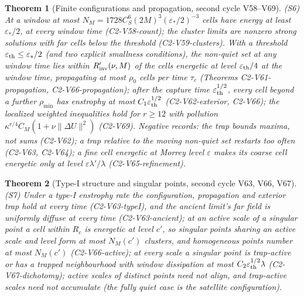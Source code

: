 \documentclass[11pt]{article}
\theoremstyle{plain}
\newtheorem{theorem}{Theorem}[section]
\theoremstyle{definition}
\theoremstyle{remark}
\begin{document}
\begin{theorem}[Finite configurations and propagation, second cycle V58--V69]
\label{thm:c4v1-propagation}
(S6) At a window at most \(N_M=1728C_S^6(2M)^3(\varepsilon_*/2)^{-3}\) cells have
energy at least \(\varepsilon_*/2\), at every window time (C2-V58-count); the
cluster limits are nonzero strong solutions with far cells below the
threshold (C2-V59-clusters).  With a threshold \(\varepsilon_{\rm th}\le\varepsilon_*/2\)
(and two explicit smallness conditions), the non-quiet set at any
window time lies within \(R'_{\rm inv}(\nu,M)\) of the cells energetic at
level \(\varepsilon_{\rm th}/4\) at the window time, propagating at most \(\rho_0\)
cells per time \(\tau_c\) (Theorems C2-V61-propagation,
C2-V66-propagation); after the capture time \(\varepsilon_{\rm th}^{1/2}\), every
cell beyond a further \(\rho_{\min}\) has enstrophy at most
\(C_1\varepsilon_{\rm th}^{1/2}\) (C2-V62-exterior, C2-V66); the localized weighted
inequalities hold for \(r\ge12\) with pollution \(\kappa^{r/4}C_M(1+\nu\|\Delta U\|^2)\)
(C2-V69).  Negative records: the trap bounds maxima, not sums
(C2-V62); a trap relative to the moving non-quiet set restarts too
often (C2-V63, C2-V64); a fine cell energetic at Morrey level \(\varepsilon\)
makes its coarse cell energetic only at level \(\varepsilon\lambda'/\lambda\)
(C2-V65-refinement).
\end{theorem}

\begin{theorem}[Type-I structure and singular points, second cycle V63, V66, V67]
\label{thm:c4v1-typeI}
(S7) Under a type-I enstrophy rate the configuration, propagation and
exterior trap hold at every time (C2-V63-typeI), and the ancient
limit's far field is uniformly diffuse at every time
(C2-V63-ancient); at an active scale of a singular point a cell within
\(R_c\) is energetic at level \(c'\), so singular points sharing an active
scale and level form at most \(N_M(c')\) clusters, and homogeneous
points number at most \(N_M(c')\) (C2-V66-active); at every scale a
singular point is trap-active or has a trapped neighbourhood with
window dissipation at most \(C_2\varepsilon_{\rm th}^{1/2}\lambda\) (C2-V67-dichotomy);
active scales of distinct points need not align, and trap-active
scales need not accumulate (the fully quiet case is the satellite
configuration).
\end{theorem}
\end{document}
